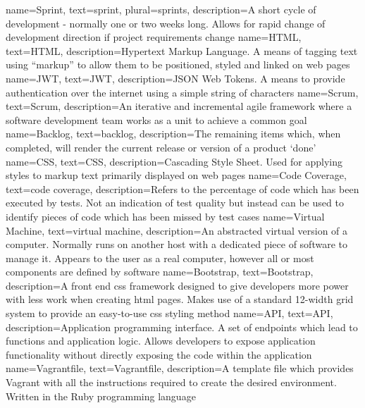{
    name={Sprint},
    text={sprint},
    plural={sprints},
    description={A short cycle of development - normally one or two weeks long. Allows for rapid change of development direction if project requirements change}
}
{
    name={HTML},
    text={HTML},
    description={Hypertext Markup Language. A means of tagging text using ``markup'' to allow them to be positioned, styled and linked on web pages}
}
{
    name={JWT},
    text={JWT},
    description={JSON Web Tokens. A means to provide authentication over the internet using a simple string of characters}
}
{
    name={Scrum},
    text={Scrum},
    description={An iterative and incremental agile framework where a software development team works as a unit to achieve a common goal}
}
{
    name={Backlog},
    text={backlog},
    description={The remaining items which, when completed, will render the current release or version of a product `done'}
}
{
    name={CSS},
    text={CSS},
    description={Cascading Style Sheet. Used for applying styles to markup text primarily displayed on web pages}
}
{
    name={Code Coverage},
    text={code coverage},
    description={Refers to the percentage of code which has been executed by tests. Not an indication of test quality but instead can be used to identify pieces of code which has been missed by test cases}
}
{
    name={Virtual Machine},
    text={virtual machine},
    description={An abstracted virtual version of a computer. Normally runs on another host with a dedicated piece of software to manage it. Appears to the user as a real computer, however all or most components are defined by software}
}
{
    name={Bootstrap},
    text={Bootstrap},
    description={A front end css framework designed to give developers more power with less work when creating html pages. Makes use of a standard 12-width grid system to provide an easy-to-use css styling method}
}
{
    name={API},
    text={API},
    description={Application programming interface. A set of endpoints which lead to functions and application logic. Allows developers to expose application functionality without directly exposing the code within the application}
}
{
    name={Vagrantfile},
    text={Vagrantfile},
    description={A template file which provides Vagrant with all the instructions required to create the desired environment. Written in the Ruby programming language}
}
